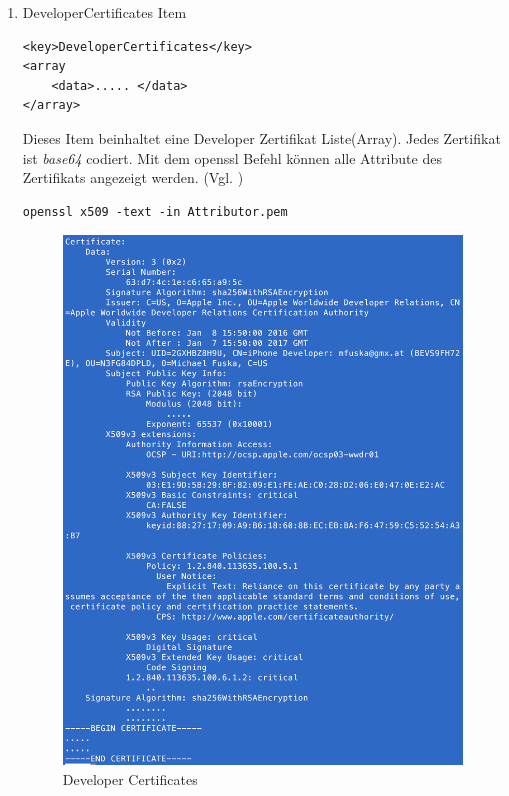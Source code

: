 \begin{enumerate}
    \item DeveloperCertificates Item
\begin{lstlisting}[captionpos=b, caption={DeveloperCertificates Item}]        
<key>DeveloperCertificates</key>
<array                
    <data>..... </data>
</array>
\end{lstlisting}
Dieses Item beinhaltet eine Developer Zertifikat Liste(Array). Jedes Zertifikat ist \textit{\glqq base64\grqq{}} codiert. Mit dem \glqq openssl\grqq{} Befehl können alle Attribute des Zertifikats angezeigt werden. (Vgl. \cite{iOSSec[5], Hacking[1]}) \newline

\lstset{
    language=bash,
    }
\begin{lstlisting}[captionpos=b, caption={Befehl: openssl -- (Siehe Abbildung: \ref{fig:DeveloperCertificates})}]
openssl x509 -text -in Attributor.pem 
\end{lstlisting}

\begin{figure}[!ht]
        \centering
                \includegraphics[scale=0.7]{Cert-output}
        \caption{Developer Certificates}
        \label{fig:DeveloperCertificates}
\end{figure}


\end{enumerate}
